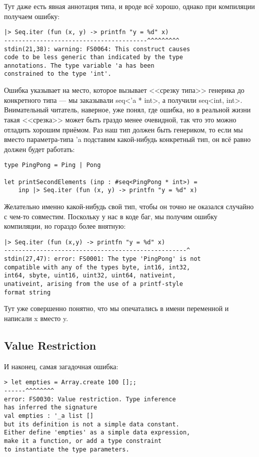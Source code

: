 \documentclass{../../text-style}
\begin{document}
Тут даже есть явная аннотация типа, и вроде всё хорошо, однако при компиляции получаем ошибку:

\begin{verbatim}
|> Seq.iter (fun (x, y) -> printfn "y = %d" x)
----------------------------------------^^^^^^^^^
stdin(21,38): warning: FS0064: This construct causes 
code to be less generic than indicated by the type 
annotations. The type variable 'a has been 
constrained to the type 'int'.
\end{verbatim}

Ошибка указывает на место, которое вызывает <<срезку типа>> генерика до конкретного типа --- мы заказывали seq<'a * int>, а получили seq<int, int>. Внимательный читатель, наверное, уже понял, где ошибка, но в реальной жизни такая <<срезка>> может быть граздо менее очевидной, так что это можно отладить хорошим приёмом. Раз наш тип должен быть генериком, то если мы вместо параметра-типа 'a подставим какой-нибудь конкретный тип, он всё равно должен будет работать:

\begin{verbatim}
type PingPong = Ping | Pong

let printSecondElements (inp : #seq<PingPong * int>) =
    inp |> Seq.iter (fun (x, y) -> printfn "y = %d" x)
\end{verbatim}

Желательно именно какой-нибудь свой тип, чтобы он точно не оказался случайно с чем-то совместим. Поскольку у нас в коде баг, мы получим ошибку компиляции, но гораздо более внятную:


\begin{verbatim}
|> Seq.iter (fun (x,y) -> printfn "y = %d" x)
---------------------------------------------------^
stdin(27,47): error: FS0001: The type 'PingPong' is not 
compatible with any of the types byte, int16, int32, 
int64, sbyte, uint16, uint32, uint64, nativeint, 
unativeint, arising from the use of a printf-style 
format string
\end{verbatim}

Тут уже совершенно понятно, что мы опечатались в имени переменной и написали x вместо y. 

\subsection{Value Restriction}

И наконец, самая загадочная ошибка:

\begin{verbatim}
> let empties = Array.create 100 [];;
------^^^^^^^^
error: FS0030: Value restriction. Type inference 
has inferred the signature 
val empties : '_a list []
but its definition is not a simple data constant. 
Either define 'empties' as a simple data expression, 
make it a function, or add a type constraint 
to instantiate the type parameters.
\end{verbatim}
\end{document}
